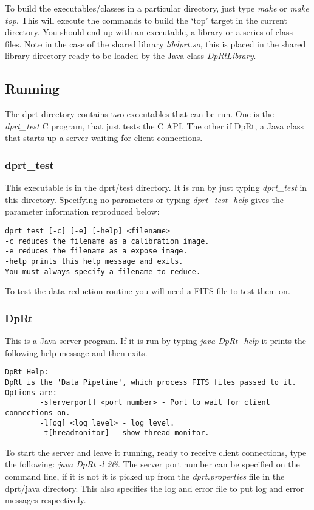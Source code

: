 \documentclass[10pt,a4paper]{article}
\begin{document}
To build the executables/classes in a particular directory, just type {\em make} or {\em make top}. 
This will execute the commands
to build the `top' target in the current directory. You should end up with an executable, a library or a series
of class files. Note in the case of the shared library {\em libdprt.so}, this is placed in the shared library directory
ready to be loaded by the Java class {\em DpRtLibrary}.

\subsection{Running}
The dprt directory contains two executables that can be run. One is the {\em dprt\_test} C program, that just
tests the C API. The other if DpRt, a Java class that starts up a server waiting for client connections.

\subsubsection{dprt\_test}
This executable is in the dprt/test directory. It is run by just typing {\em dprt\_test} in this directory.
Specifying no parameters or typing {\em dprt\_test -help} gives the parameter information reproduced below:
\begin{verbatim}
dprt_test [-c] [-e] [-help] <filename>
-c reduces the filename as a calibration image.
-e reduces the filename as a expose image.
-help prints this help message and exits.
You must always specify a filename to reduce.
\end{verbatim}
To test the data reduction routine you will need a FITS file to test them on.

\subsubsection{DpRt}
This is a Java server program. If it is run by typing {\em java DpRt -help} it prints the following help message
and then exits.
\begin{verbatim}
DpRt Help:
DpRt is the 'Data Pipeline', which process FITS files passed to it.
Options are:
        -s[erverport] <port number> - Port to wait for client connections on.
        -l[og] <log level> - log level.
        -t[hreadmonitor] - show thread monitor.
\end{verbatim}

To start the server and leave it running, ready to receive client connections, type the following:
{\em java DpRt -l 2\&}. The server port number can be specified on the command line, if it is not it is
picked up from the {\em dprt.properties} file in the dprt/java directory. This also specifies the log and
error file to put log and error messages respectively.
\end{document}
